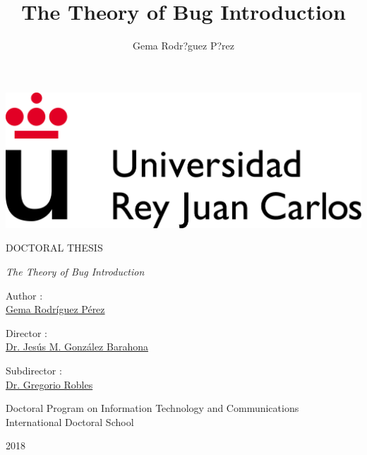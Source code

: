 \documentclass[a4paper, 12pt]{book}
\title{The Theory of Bug Introduction}
\author{Gema Rodr?guez P?rez}
\begin{document}


\begin{titlepage}
\begin{center}

\includegraphics[scale=0.5]{img/logoURJC.jpeg}

\vspace{1.5cm}

\LARGE
DOCTORAL THESIS
\vspace{0.4cm}

\LARGE
\emph{The Theory of Bug Introduction}
\vspace{0.8cm}

\Large
Author :\\
\underline{Gema Rodr\'iguez P\'erez}

Director :\\
\underline{Dr. Jes\'us M. Gonz\'alez Barahona}

Subdirector :\\
\underline{Dr. Gregorio Robles}

\vspace{1.5cm}

\large
Doctoral Program on Information Technology and Communications\\

International Doctoral School

\vspace{1cm}

\large
2018
\end{center}
\end{titlepage}

\newpage
\mbox{}
\thispagestyle{empty} %


\clearpage
{}
\end{document}
